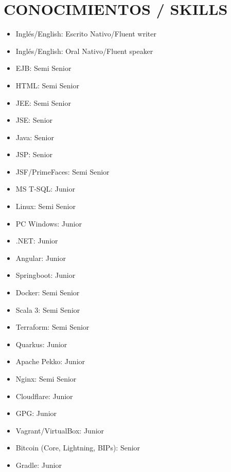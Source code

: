 \documentclass[paper=a4,fontsize=11pt]{scrartcl} %
\newcommand{\sepspace}{\vspace*{1em}}		%
\newcommand{\NewPart}[1]{\section*{\uppercase{#1}}}
\begin{document}
\NewPart{Conocimientos / Skills}{}{}{
\begin{itemize}
\item{Inglés/English: Escrito Nativo/Fluent writer}
\item{Inglés/English: Oral Nativo/Fluent speaker}
\item{EJB: Semi Senior}
\item{HTML: Semi Senior}
\item{JEE: Semi Senior}
\item{JSE: Senior}
\item{Java: Senior}
\item{JSP:  Senior}
\item{JSF/PrimeFaces: Semi Senior}
\item{MS T-SQL: Junior}
\item{Linux: Semi Senior}
\item{PC Windows: Junior}
\item{.NET: Junior}
\item{Angular: Junior}
\item{Springboot: Junior}
\item{Docker: Semi Senior}
\item{Scala 3: Semi Senior}
\item{Terraform: Semi Senior}
\item{Quarkus: Junior}
\item{Apache Pekko: Junior}
\item{Nginx: Semi Senior}
\item{Cloudflare: Junior}
\item{GPG: Junior}
\item{Vagrant/VirtualBox: Junior}
\item{Bitcoin (Core, Lightning, BIPs): Senior}
\item{Gradle: Junior}

\end{itemize}
}
\sepspace
\end{document}
